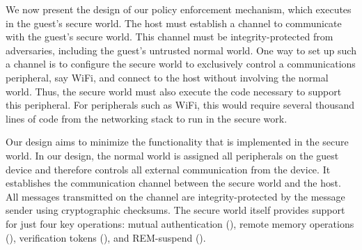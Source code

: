 \label{section:mechanism}

We now present the design of our policy enforcement mechanism, which executes
in the guest's secure world. The host must establish a channel to communicate
with the guest's secure world. This channel must be integrity-protected from
adversaries, including the guest's untrusted normal world.  One way to set up
such a channel is to configure the secure world to exclusively control a
communications peripheral, say WiFi, and connect to the host without involving
the normal world. Thus, the secure world must also execute the code necessary
to support this peripheral. For peripherals such as WiFi, this would require
several thousand lines of code from the networking stack to run in the secure
work.

Our design aims to minimize the functionality that is implemented in the secure
world.  In our design, the normal world is assigned all peripherals on the
guest device and therefore controls all external communication from the device.
It establishes the communication channel between the secure world and the host.
All messages transmitted on the channel are integrity-protected by the message
sender using cryptographic checksums. The secure world itself provides support
for just four key operations:
%
mutual authentication (), 
%
remote memory operations (),
%
verification tokens (), and
%
REM-suspend ().

